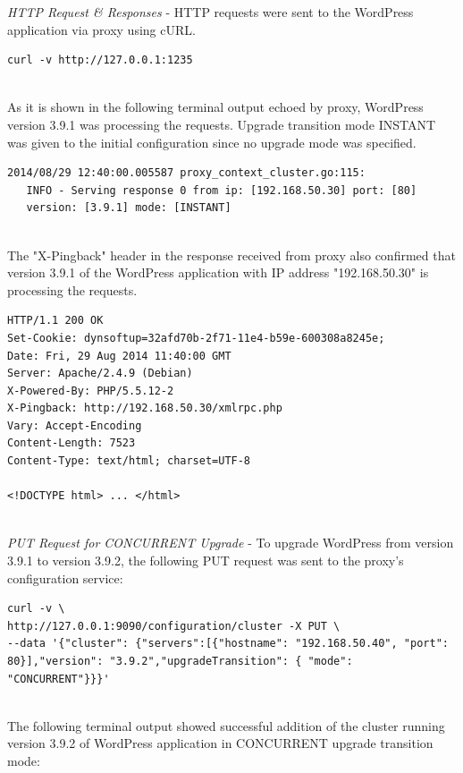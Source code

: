 \documentclass[a4paper,11pt,twoside]{report}
\begin{document}
\noindent
\textit{HTTP Request \& Responses} - HTTP requests were sent to the WordPress application via proxy using cURL.
\begin{lstlisting}[language=terminal]
curl -v http://127.0.0.1:1235
\end{lstlisting}  

\noindent\\
As it is shown in the following terminal output echoed by proxy, WordPress version 3.9.1 was processing the requests. Upgrade transition mode INSTANT was given to the initial configuration since no upgrade mode was specified. \smallskip

\begin{lstlisting}[language=terminal]
2014/08/29 12:40:00.005587 proxy_context_cluster.go:115:     
   INFO - Serving response 0 from ip: [192.168.50.30] port: [80] 
   version: [3.9.1] mode: [INSTANT]
\end{lstlisting}  

\noindent\\
The "X-Pingback" header in the response received from proxy also confirmed that version 3.9.1 of the WordPress application with IP address "192.168.50.30" is processing the requests. \smallskip 

\begin{lstlisting}[language=terminal]
HTTP/1.1 200 OK
Set-Cookie: dynsoftup=32afd70b-2f71-11e4-b59e-600308a8245e;
Date: Fri, 29 Aug 2014 11:40:00 GMT
Server: Apache/2.4.9 (Debian)
X-Powered-By: PHP/5.5.12-2
X-Pingback: http://192.168.50.30/xmlrpc.php
Vary: Accept-Encoding
Content-Length: 7523
Content-Type: text/html; charset=UTF-8
 
<!DOCTYPE html> ... </html>
\end{lstlisting} 

\noindent\\
\textit{PUT Request for CONCURRENT Upgrade} - To upgrade WordPress from version 3.9.1 to version 3.9.2, the following PUT request was sent to the proxy's configuration service: \smallskip

\begin{lstlisting}[language=terminal]
curl -v \
http://127.0.0.1:9090/configuration/cluster -X PUT \
--data '{"cluster": {"servers":[{"hostname": "192.168.50.40", "port": 80}],"version": "3.9.2","upgradeTransition": { "mode": "CONCURRENT"}}}'
\end{lstlisting}  

\noindent\\
The following terminal output showed successful addition of the cluster running version 3.9.2 of WordPress application in CONCURRENT upgrade transition mode:\smallskip
\end{document}

